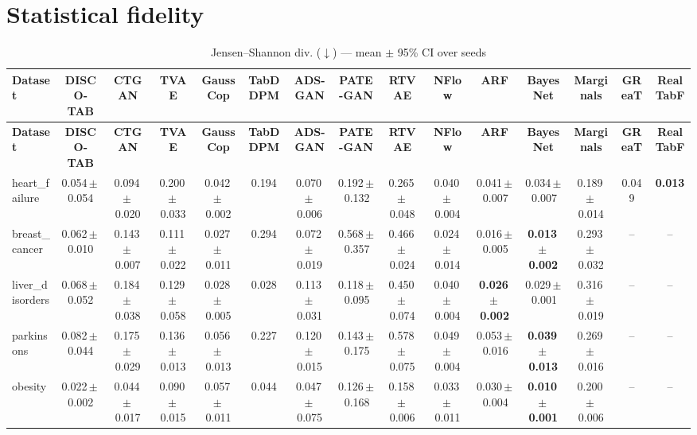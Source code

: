\documentclass[8pt]{extarticle}
\begin{document}
\section*{Statistical fidelity}
\begin{longtable}{l*{14}{c}}
\caption{Jensen--Shannon div. ($\downarrow$) --- mean $\pm$ 95\% CI over seeds}\\
\toprule
\textbf{Dataset} & \textbf{DISCO-TAB} & \textbf{CTGAN} & \textbf{TVAE} & \textbf{GaussCop} & \textbf{TabDDPM} & \textbf{ADS-GAN} & \textbf{PATE-GAN} & \textbf{RTVAE} & \textbf{NFlow} & \textbf{ARF} & \textbf{BayesNet} & \textbf{Marginals} & \textbf{GReaT} & \textbf{RealTabF} \\
\midrule
\endfirsthead
\toprule
\textbf{Dataset} & \textbf{DISCO-TAB} & \textbf{CTGAN} & \textbf{TVAE} & \textbf{GaussCop} & \textbf{TabDDPM} & \textbf{ADS-GAN} & \textbf{PATE-GAN} & \textbf{RTVAE} & \textbf{NFlow} & \textbf{ARF} & \textbf{BayesNet} & \textbf{Marginals} & \textbf{GReaT} & \textbf{RealTabF} \\
\midrule
\endhead
\bottomrule
\endfoot
heart\_failure & 0.054\,$\pm$\,0.054 & 0.094\,$\pm$\,0.020 & 0.200\,$\pm$\,0.033 & 0.042\,$\pm$\,0.002 & 0.194 & 0.070\,$\pm$\,0.006 & 0.192\,$\pm$\,0.132 & 0.265\,$\pm$\,0.048 & 0.040\,$\pm$\,0.004 & 0.041\,$\pm$\,0.007 & 0.034\,$\pm$\,0.007 & 0.189\,$\pm$\,0.014 & 0.049 & \textbf{0.013} \\
breast\_cancer & 0.062\,$\pm$\,0.010 & 0.143\,$\pm$\,0.007 & 0.111\,$\pm$\,0.022 & 0.027\,$\pm$\,0.011 & 0.294 & 0.072\,$\pm$\,0.019 & 0.568\,$\pm$\,0.357 & 0.466\,$\pm$\,0.024 & 0.024\,$\pm$\,0.014 & 0.016\,$\pm$\,0.005 & \textbf{0.013\,$\pm$\,0.002} & 0.293\,$\pm$\,0.032 & -- & -- \\
liver\_disorders & 0.068\,$\pm$\,0.052 & 0.184\,$\pm$\,0.038 & 0.129\,$\pm$\,0.058 & 0.028\,$\pm$\,0.005 & 0.028 & 0.113\,$\pm$\,0.031 & 0.118\,$\pm$\,0.095 & 0.450\,$\pm$\,0.074 & 0.040\,$\pm$\,0.004 & \textbf{0.026\,$\pm$\,0.002} & 0.029\,$\pm$\,0.001 & 0.316\,$\pm$\,0.019 & -- & -- \\
parkinsons & 0.082\,$\pm$\,0.044 & 0.175\,$\pm$\,0.029 & 0.136\,$\pm$\,0.013 & 0.056\,$\pm$\,0.013 & 0.227 & 0.120\,$\pm$\,0.015 & 0.143\,$\pm$\,0.175 & 0.578\,$\pm$\,0.075 & 0.049\,$\pm$\,0.004 & 0.053\,$\pm$\,0.016 & \textbf{0.039\,$\pm$\,0.013} & 0.269\,$\pm$\,0.016 & -- & -- \\
obesity & 0.022\,$\pm$\,0.002 & 0.044\,$\pm$\,0.017 & 0.090\,$\pm$\,0.015 & 0.057\,$\pm$\,0.011 & 0.044 & 0.047\,$\pm$\,0.075 & 0.126\,$\pm$\,0.168 & 0.158\,$\pm$\,0.006 & 0.033\,$\pm$\,0.011 & 0.030\,$\pm$\,0.004 & \textbf{0.010\,$\pm$\,0.001} & 0.200\,$\pm$\,0.006 & -- & -- \\

\end{longtable}
\end{document}
